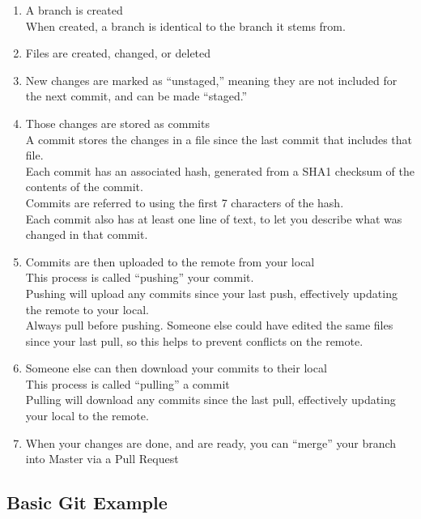 \documentclass{article}
\begin{document}
\begin{enumerate}
	\item A branch is created
		\\When created, a branch is identical to the branch it stems from.
	\item Files are created, changed, or deleted
	\item New changes are marked as ``unstaged,'' meaning they are not included for the next commit, and can be made ``staged.''
	\item Those changes are stored as commits
		\\A commit stores the changes in a file since the last commit that includes that file.
		\\Each commit has an associated hash, generated from a SHA1 checksum of the contents of the commit.
		\\Commits are referred to using the first 7 characters of the hash.
		\\Each commit also has at least one line of text, to let you describe what was changed in that commit.
	\item Commits are then uploaded to the remote from your local
		\\This process is called ``pushing'' your commit.
		\\Pushing will upload any commits since your last push, effectively updating the remote to your local.
		\\Always pull before pushing. Someone else could have edited the same files since your last pull, so this helps to prevent conflicts on the remote.
	\item Someone else can then download your commits to their local
		\\This process is called ``pulling'' a commit
		\\Pulling will download any commits since the last pull, effectively updating your local to the remote.
	\item When your changes are done, and are ready, you can ``merge'' your branch into Master via a Pull Request
\end{enumerate}

\subsection{Basic Git Example}
\end{document}
